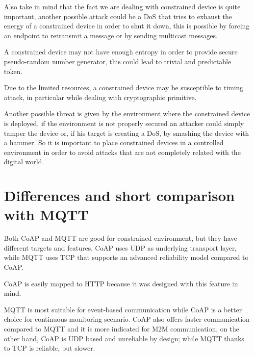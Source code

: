 	Also take in mind that the fact we are dealing with constrained device is quite important, another possible attack could be a DoS that tries to exhaust the energy of a constrained device in order to shut it down, this is possible by forcing an endpoint to retransmit a message or by sending multicast messages.\newline
	
	A constrained device may not have enough entropy in order to provide secure pseudo-random number generator, this could lead to trivial and predictable token.\newline
	
	Due to the limited resources, a constrained device may be susceptible to timing attack, in particular while dealing with cryptographic primitive.\newline
	
	Another possible threat is given by the environment where the constrained device is deployed, if the environment is not properly secured an attacker could simply tamper the device or, if his target is creating a DoS, by smashing the device with a hammer.\newline
	So it is important to place constrained devices in a controlled environment in order to avoid attacks that are not completely related with the digital world.\newline
	
	\section{Differences and short comparison with MQTT}
	Both CoAP and MQTT are good for constrained environment, but they have different targets and features, CoAP uses UDP as underlying transport layer, while MQTT uses TCP that supports an advanced reliability model compared to CoAP.\newline
	
	CoAP is easily mapped to HTTP because it was designed with this feature in mind.\newline
	
	MQTT is most suitable for event-based communication while CoAP is a better choice for continuous monitoring scenario.\newline
	CoAP also offers faster communication compared to MQTT and it is more indicated for M2M communication, on the other hand, CoAP is UDP based and unreliable by design; while MQTT thanks to TCP is reliable, but slower.\newline
	
